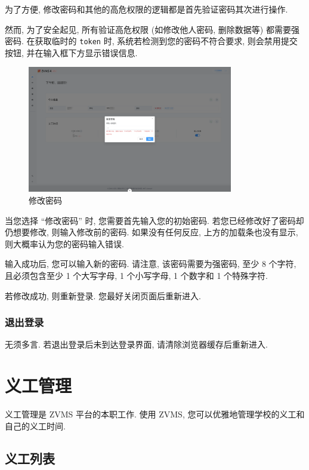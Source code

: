 \documentclass{article}
\begin{document}
为了方便, 修改密码和其他的高危权限的逻辑都是首先验证密码其次进行操作.

然而, 为了安全起见, 所有验证高危权限 (如修改他人密码, 删除数据等) 都需要强密码. 在获取临时的 \texttt{token} 时, 系统若检测到您的密码不符合要求, 则会禁用提交按钮, 并在输入框下方显示错误信息.

\begin{figure}[H]
  \centering
  \includegraphics[width=0.8\textwidth]{../assets/image-20240303153008248.png}
  \caption{修改密码}
  \label{fig:change-password}
\end{figure}

当您选择 ``修改密码'' 时, 您需要首先输入您的初始密码. 若您已经修改好了密码却仍想要修改, 则输入修改前的密码. 如果没有任何反应, 上方的加载条也没有显示, 则大概率认为您的密码输入错误.

输入成功后, 您可以输入新的密码. 请注意, 该密码需要为强密码, 至少 8 个字符, 且必须包含至少 1 个大写字母, 1 个小写字母, 1 个数字和 1 个特殊字符.

若修改成功, 则重新登录. 您最好关闭页面后重新进入.

\subsubsection{退出登录}

无须多言. 若退出登录后未到达登录界面, 请清除浏览器缓存后重新进入.

\section{义工管理}

义工管理是 ZVMS 平台的本职工作. 使用 ZVMS, 您可以优雅地管理学校的义工和自己的义工时间.

\subsection{义工列表}
\end{document}
